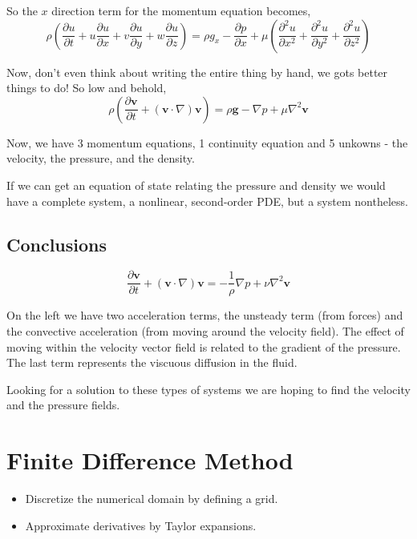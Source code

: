 \documentclass[10pt,a4paper,draft]{article}
\begin{document}
So the $x$ direction term for the momentum equation becomes,
\begin{equation}
\rho\left( 
	\frac{\partial u}{\partial t} + u\frac{\partial u}{\partial x} + v\frac{\partial u}{\partial y} + w\frac{\partial u}{\partial z}
\right)
= 
  \rho g_x 
- \frac{\partial p}{\partial x}
+ \mu\left(
	\frac{\partial^2 u}{\partial x^2} + \frac{\partial^2 u}{\partial y^2} + \frac{\partial^2 u}{\partial z^2}
	\right)	
\end{equation}


Now, don't even think about writing the entire thing by hand, we gots better things to do!
So low and behold,
\begin{equation}
\rho\left( 
	\frac{\partial \mathbf{v}}{\partial t} 
	+ \left(\mathbf{v}\cdot\nabla\right)\mathbf{v}
\right)
=
\rho\mathbf{g}
- \nabla p
+ \mu \nabla^2 \mathbf{v} 
\end{equation}

Now, we have 3 momentum equations, 1 continuity equation and 5 unkowns - the velocity, the pressure, and the density.

If we can get an equation of state relating the pressure and density we would have a complete system, a nonlinear, second-order PDE, but a system nontheless.


\subsection{Conclusions}
\begin{equation}
\frac{\partial \mathbf{v}}{\partial t} 
+ \left(\mathbf{v}\cdot\nabla\right) \mathbf{v}
=
- \frac{1}{\rho}\nabla p
+ \nu\nabla^2 \mathbf{v}
\end{equation}

On the left we have two acceleration terms, the unsteady term (from forces) and the convective acceleration (from moving around the velocity field).
The effect of moving within the velocity vector field is related to the gradient of the pressure. The last term represents the viscuous diffusion in the fluid.

Looking for a solution to these types of systems we are hoping to find the velocity and the pressure fields.



\section{Finite Difference Method}
\begin{itemize}
\item Discretize the numerical domain by defining a grid.
\item Approximate derivatives by Taylor expansions.
\end{itemize}
\end{document}
